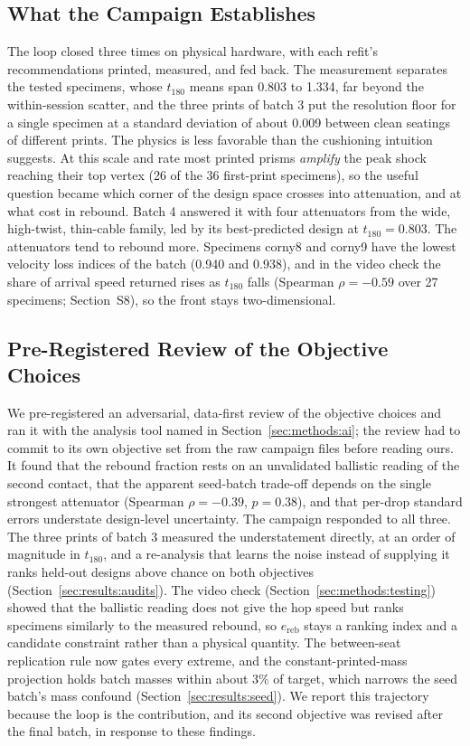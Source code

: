 \documentclass[11pt]{article}
\begin{document}
\subsection{What the Campaign Establishes}
The loop closed three times on physical hardware, with each refit's
recommendations printed, measured, and fed back. The measurement
separates the tested specimens, whose $t_{180}$ means span 0.803 to
1.334, far beyond the within-session scatter, and the three prints of
batch 3 put the resolution floor for a single specimen at a standard
deviation of about 0.009 between clean seatings of different prints. The
physics is less favorable than the cushioning intuition suggests. At this
scale and rate most printed prisms \emph{amplify} the peak shock reaching
their top vertex (26 of the 36 first-print specimens), so the useful question became
which corner of the design space crosses into attenuation, and at what
cost in rebound. Batch 4 answered it with four attenuators from the wide,
high-twist, thin-cable family, led by its best-predicted design at
$t_{180} = 0.803$. The attenuators tend to rebound more. Specimens corny8 and
corny9 have the lowest velocity loss indices of the batch (0.940 and
0.938), and in the video check the share of arrival speed returned rises
as $t_{180}$ falls (Spearman $\rho = -0.59$ over 27 specimens;
Section~S8), so the front stays two-dimensional.

\subsection{Pre-Registered Review of the Objective Choices}
\label{sec:discussion:review}
We
pre-registered an adversarial, data-first review of the objective choices
and ran it with the analysis tool named in Section~\ref{sec:methods:ai}; the
review had to commit to its own objective set from the raw campaign files
before reading ours. It found that the rebound fraction rests on an
unvalidated ballistic reading of the second contact, that the apparent
seed-batch trade-off depends on the single strongest attenuator
(Spearman $\rho = -0.39$, $p = 0.38$), and that per-drop standard errors
understate design-level uncertainty. The campaign responded to all
three. The three prints of batch 3 measured the understatement directly,
at an order of magnitude in $t_{180}$, and a re-analysis that learns the
noise instead of supplying it ranks held-out designs above chance on both
objectives (Section~\ref{sec:results:audits}). The video check
(Section~\ref{sec:methods:testing}) showed that the ballistic reading
does not give the hop speed but ranks specimens similarly to the
measured rebound, so $e_{\mathrm{reb}}$ stays a ranking index and a
candidate constraint rather than a physical quantity. The between-seat
replication rule now gates every extreme, and the constant-printed-mass
projection holds batch masses within about 3\% of target, which narrows
the seed batch's mass confound (Section~\ref{sec:results:seed}). We
report this trajectory because the loop is the contribution, and its
second objective was revised after the final batch, in response to
these findings.
\end{document}
